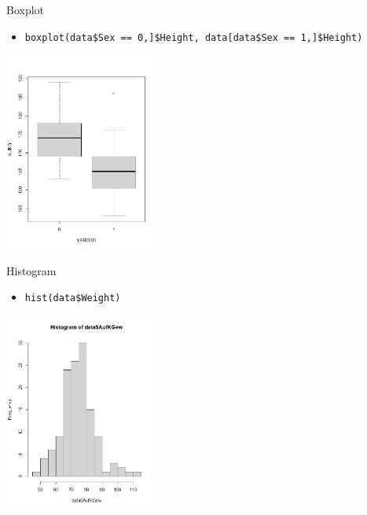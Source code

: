 \documentclass[aspectratio = 169]{chariteBeamer}
\begin{document}
\begin{frame}[fragile]{Boxplot}
	\begin{itemize}
		\item \verb+boxplot(data$Sex == 0,]$Height, data[data$Sex == 1,]$Height)+
	\end{itemize}
			
	\begin{center}
		\includegraphics[height=6.5cm]{Boxplot}
	\end{center}
\end{frame}

\begin{frame}[fragile]{Histogram}
	\begin{itemize}
		\item \verb+hist(data$Weight)+
	\end{itemize}
			
	\begin{center}
		\includegraphics[height=6.5cm]{Histogram}
	\end{center}
\end{frame}
\end{document}
